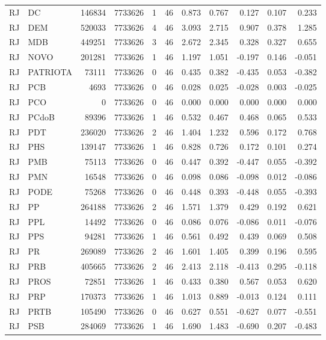 \begin{landscape}
\begin{longtable}{llrrrrrrrrr}
RJ & DC & 146834 & 7733626 & 1 & 46 & 0.873 & 0.767 & 0.127 & 0.107 & 0.233 \\
RJ & DEM & 520033 & 7733626 & 4 & 46 & 3.093 & 2.715 & 0.907 & 0.378 & 1.285 \\
RJ & MDB & 449251 & 7733626 & 3 & 46 & 2.672 & 2.345 & 0.328 & 0.327 & 0.655 \\
RJ & NOVO & 201281 & 7733626 & 1 & 46 & 1.197 & 1.051 & -0.197 & 0.146 & -0.051 \\
RJ & PATRIOTA & 73111 & 7733626 & 0 & 46 & 0.435 & 0.382 & -0.435 & 0.053 & -0.382 \\
RJ & PCB & 4693 & 7733626 & 0 & 46 & 0.028 & 0.025 & -0.028 & 0.003 & -0.025 \\
RJ & PCO & 0 & 7733626 & 0 & 46 & 0.000 & 0.000 & 0.000 & 0.000 & 0.000 \\
RJ & PCdoB & 89396 & 7733626 & 1 & 46 & 0.532 & 0.467 & 0.468 & 0.065 & 0.533 \\
RJ & PDT & 236020 & 7733626 & 2 & 46 & 1.404 & 1.232 & 0.596 & 0.172 & 0.768 \\
RJ & PHS & 139147 & 7733626 & 1 & 46 & 0.828 & 0.726 & 0.172 & 0.101 & 0.274 \\
RJ & PMB & 75113 & 7733626 & 0 & 46 & 0.447 & 0.392 & -0.447 & 0.055 & -0.392 \\
RJ & PMN & 16548 & 7733626 & 0 & 46 & 0.098 & 0.086 & -0.098 & 0.012 & -0.086 \\
RJ & PODE & 75268 & 7733626 & 0 & 46 & 0.448 & 0.393 & -0.448 & 0.055 & -0.393 \\
RJ & PP & 264188 & 7733626 & 2 & 46 & 1.571 & 1.379 & 0.429 & 0.192 & 0.621 \\
RJ & PPL & 14492 & 7733626 & 0 & 46 & 0.086 & 0.076 & -0.086 & 0.011 & -0.076 \\
RJ & PPS & 94281 & 7733626 & 1 & 46 & 0.561 & 0.492 & 0.439 & 0.069 & 0.508 \\
RJ & PR & 269089 & 7733626 & 2 & 46 & 1.601 & 1.405 & 0.399 & 0.196 & 0.595 \\
RJ & PRB & 405665 & 7733626 & 2 & 46 & 2.413 & 2.118 & -0.413 & 0.295 & -0.118 \\
RJ & PROS & 72851 & 7733626 & 1 & 46 & 0.433 & 0.380 & 0.567 & 0.053 & 0.620 \\
RJ & PRP & 170373 & 7733626 & 1 & 46 & 1.013 & 0.889 & -0.013 & 0.124 & 0.111 \\
RJ & PRTB & 105490 & 7733626 & 0 & 46 & 0.627 & 0.551 & -0.627 & 0.077 & -0.551 \\
RJ & PSB & 284069 & 7733626 & 1 & 46 & 1.690 & 1.483 & -0.690 & 0.207 & -0.483 \\

\end{longtable}
\end{landscape}
